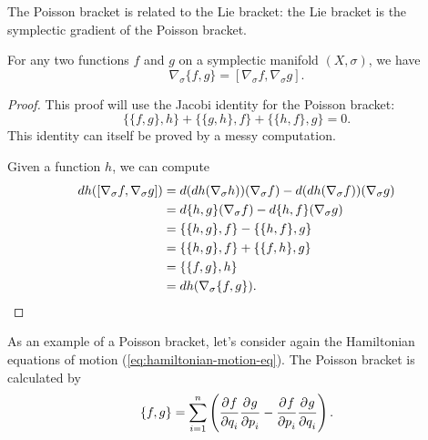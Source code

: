 \documentclass[twoside,letterpaper,11pt]{article}
\newcommand{\sgrad}{\nabla_{\sigma}}
\numberwithin{equation}{section}
\begin{document}
The Poisson bracket is related to the Lie bracket:
the Lie bracket is the symplectic gradient of the Poisson bracket.
\begin{prop}
  For any two functions $f$ and $g$ on a symplectic manifold $(X, \sigma)$, we
  have
  \begin{equation*}
    \sgrad \{f, g\} = [\sgrad f, \sgrad g].
  \end{equation*} 
\end{prop}
\begin{proof}
  This proof will use the Jacobi identity for the Poisson bracket:
  \begin{equation*}
    \{\{f, g\}, h\} + \{\{g, h\}, f\} + \{\{h, f\}, g\} = 0.
  \end{equation*}
  This identity can itself be proved by a messy computation.

  Given a function $h$, we can compute
  \begin{align*}
    \dif h([\sgrad f, \sgrad g]) &= \dif (\dif h (\sgrad h)) (\sgrad f) - \dif
                                   (\dif h (\sgrad f)) (\sgrad g)\\
                                 &= \dif \{h, g\} (\sgrad f) - \dif \{h, f\}
                       (\sgrad g)\\
                                 &= \{ \{h, g\}, f\} - \{ \{ h, f\}, g\}\\
                                 &= \{\{h, g\}, f\} + \{\{f, h\}, g\}\\
                                 &= \{\{f, g\}, h\}\\
                                 &= \dif h (\sgrad \{f, g\}).
  \end{align*}
\end{proof}

As an example of a Poisson bracket, let's consider again the Hamiltonian
equations of motion (\cref{eq:hamiltonian-motion-eq}).
The Poisson bracket is calculated by
\begin{equation*}
  \{f, g\} = \sum_{i=1}^n \left( \frac{\strut\partial^{}f}{\strut\partial q_i^{}} \frac{\strut\partial^{}g}{\strut\partial p_i^{}} - \frac{\strut\partial^{}f}{\strut\partial p_i^{}}
    \frac{\strut\partial^{}g}{\strut\partial q_i^{}} \right).
\end{equation*}
\end{document}
